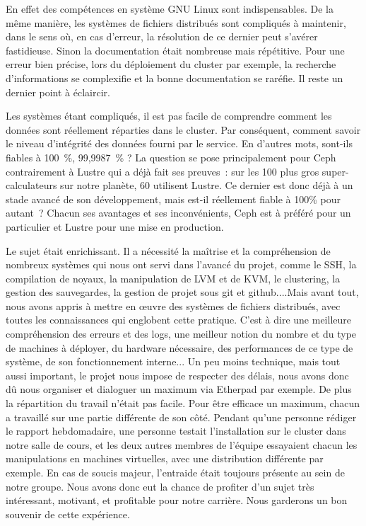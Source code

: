 \documentclass[12pt]{article}
\begin{document}
En effet des compétences en système GNU Linux sont indispensables. De la même manière, les systèmes de fichiers distribués sont compliqués à maintenir, dans le sens où, en cas d'erreur, la résolution de ce dernier peut s'avérer fastidieuse. Sinon la documentation était nombreuse mais répétitive. Pour une erreur bien précise, lors du déploiement du cluster par exemple, la recherche d'informations se complexifie et la bonne documentation se raréfie. Il reste un dernier point à éclaircir. 

Les systèmes étant compliqués, il est pas facile de comprendre comment les données sont réellement réparties dans le cluster. Par conséquent, comment savoir le niveau d'intégrité des données fourni par le service. En d'autres mots, sont-ils fiables à 100 \%, 99,9987 \% ? La question se pose principalement pour Ceph contrairement à Lustre qui a déjà fait ses preuves : sur les 100 plus gros super-calculateurs sur notre planète, 60 utilisent Lustre. Ce dernier est donc déjà à un stade avancé de son développement, mais est-il réellement fiable à 100\% pour autant ? Chacun ses avantages et ses inconvénients, Ceph est à préféré pour un particulier et Lustre pour une mise en production.

Le sujet était enrichissant. Il a nécessité la maîtrise et la compréhension de nombreux systèmes qui nous ont servi dans l'avancé du projet, comme le SSH, la compilation de noyaux, la manipulation de LVM et de KVM, le clustering, la gestion des sauvegardes, la gestion de projet sous git et github....Mais avant tout, nous avons appris à mettre en œuvre des systèmes de fichiers distribués, avec toutes les connaissances qui englobent cette pratique. C'est à dire une meilleure compréhension des erreurs et des logs, une meilleur notion du nombre et du type de machines à déployer, du hardware nécessaire, des performances de ce type de système, de son fonctionnement interne... Un peu moins technique, mais tout aussi important, le projet nous impose de respecter des délais, nous avons donc dû nous organiser et dialoguer un maximum via Etherpad par exemple. De plus la répartition du travail n'était pas facile. Pour être efficace un maximum, chacun a travaillé sur une partie différente de son côté. Pendant qu'une personne rédiger le rapport hebdomadaire, une personne testait l'installation sur le cluster dans notre salle de cours, et les deux autres membres de l'équipe essayaient chacun les manipulations en machines virtuelles, avec une distribution différente par exemple. En cas de soucis majeur, l'entraide était toujours présente au sein de notre groupe. 
	Nous avons donc eut la chance de profiter d'un sujet très intéressant, motivant, et profitable pour notre carrière. Nous garderons un bon souvenir de cette expérience.
\newpage
\end{document}
